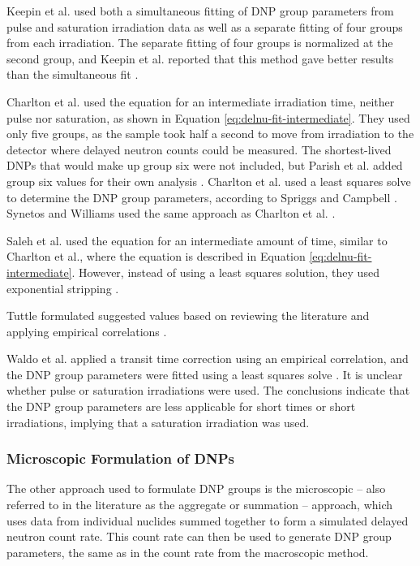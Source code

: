 Keepin et al. used both a simultaneous fitting of \gls{DNP} group parameters from pulse and saturation irradiation data as well as a separate fitting of four groups from each irradiation.
The separate fitting of four groups is normalized at the second group, and Keepin et al. reported that this method gave better results than the simultaneous fit \cite{keepin1957delayed}.

Charlton et al. used the equation for an intermediate irradiation time, neither pulse nor saturation, as shown in Equation \eqref{eq:delnu-fit-intermediate}.
They used only five groups, as the sample took half a second to move from irradiation to the detector where delayed neutron counts could be measured.
The shortest-lived \glspl{DNP} that would make up group six were not included, but Parish et al. added group six values for their own analysis \cite{parish1999status}.
Charlton et al. used a least squares solve to determine the \gls{DNP} group parameters, according to Spriggs and Campbell \cite{Spriggs2000Summary}.
Synetos and Williams used the same approach as Charlton et al. \cite{synetos1983delayed, spriggs20028}.

Saleh et al. used the equation for an intermediate amount of time, similar to Charlton et al., where the equation is described in Equation \eqref{eq:delnu-fit-intermediate}.
However, instead of using a least squares solution, they used exponential stripping \cite{saleh1997measurements}.

Tuttle formulated suggested values based on reviewing the literature and applying empirical correlations \cite{tuttle1975delayed}.

Waldo et al. applied a transit time correction using an empirical correlation, and the \gls{DNP} group parameters were fitted using a least squares solve \cite{waldo1981delayed}.
It is unclear whether pulse or saturation irradiations were used.
The conclusions indicate that the \gls{DNP} group parameters are less applicable for short times or short irradiations, implying that a saturation irradiation was used. 





\subsubsection{Microscopic Formulation of DNPs}
\label{sec:micro-eval}
The other approach used to formulate \gls{DNP} groups is the microscopic -- also referred to in the literature as the aggregate or summation -- approach, which uses data from individual nuclides summed together to form a simulated delayed neutron count rate.
This count rate can then be used to generate \gls{DNP} group parameters, the same as in the count rate from the macroscopic method.

